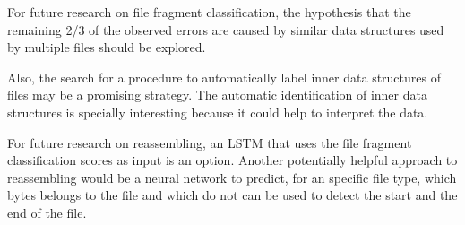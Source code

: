 For future research on file fragment classification, the hypothesis that the remaining 2/3 of the observed errors are caused by similar data structures used by multiple files should be explored.

Also, the search for a procedure to automatically label inner data structures of files may be a promising strategy. The automatic identification of inner data structures is specially interesting because it could help to interpret the data.

For future research on reassembling, an LSTM that uses the file fragment classification scores as input is an option. Another potentially helpful approach to reassembling would be a neural network to predict, for an specific file type, which bytes belongs to the file and which do not can be used to detect the start and the end of the file.











